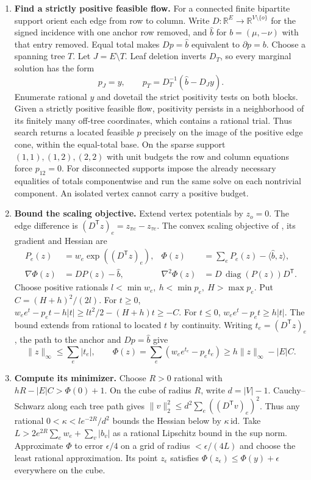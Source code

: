 \documentclass[11pt,a4paper]{article}
\theoremstyle{definition}
\theoremstyle{remark}\newaliascnt{remark}{theorem}
\newcommand{\R}{\mathbb R}
\newcommand{\id}{\mathrm{id}}
\numberwithin{equation}{section}
\begin{document}
\begin{enumerate}[titledsteps]
    \item \textbf{Find a strictly positive feasible flow.} For a connected finite bipartite support orient each edge from row to column. Write \(D:\R^E\to\R^{V\setminus\{o\}}\) for the signed incidence with one anchor row removed, and \(\widehat b\) for \(b=(\mu,-\nu)\) with that entry removed. Equal total makes \(Dp=\widehat b\) equivalent to \(\partial p=b\). Choose a spanning tree \(T\). Let \(J=E\setminus T\). Leaf deletion inverts \(D_T\), so every marginal solution has the form
\[
 p_J=y,\qquad p_T=D_T^{-1}(\widehat b-D_J y).
\]
Enumerate rational \(y\) and dovetail the strict positivity tests on both blocks. Given a strictly positive feasible flow, positivity persists in a neighborhood of its finitely many off-tree coordinates, which contains a rational trial. Thus search returns a located feasible \(p\) precisely on the image of the positive edge cone, within the equal-total base. On the sparse support \((1,1),(1,2),(2,2)\) with unit budgets the row and column equations force \(p_{12}=0\). For disconnected supports impose the already necessary equalities of totals componentwise and run the same solve on each nontrivial component. An isolated vertex cannot carry a positive budget.


    \item \textbf{Bound the scaling objective.} Extend vertex potentials by \(z_o=0\). The edge difference is \((D^{\mathsf T}z)_e=z_{\pi e}-z_{\tau e}\). The convex scaling objective of \cite{rothblum-scale}, its gradient and Hessian are
\[
\begin{aligned}
 P_e(z)&=w_e\exp((D^{\mathsf T}z)_e),&
 \Phi(z)&=\sum_e P_e(z)-\langle\widehat b,z\rangle,\\
 \nabla\Phi(z)&=DP(z)-\widehat b,&
 \nabla^2\Phi(z)&=D\,\operatorname{diag}(P(z))D^{\mathsf T}.
\end{aligned}
\]
Choose positive rationals \(l<\min w_e,\ h<\min p_e,\ H>\max p_e\). Put \(C=(H+h)^2/(2l)\). For \(t\ge0\), \(w_e e^t-p_et-h|t|\ge lt^2/2-(H+h)t\ge-C\). For \(t\le0\), \(w_e e^t-p_et\ge h|t|\). The bound extends from rational to located \(t\) by continuity. Writing \(t_e=(D^{\mathsf T}z)_e\), the path to the anchor and \(Dp=\widehat b\) give
\[
 \|z\|_\infty\le\sum_e|t_e|,\qquad
 \Phi(z)=\sum_e(w_e e^{t_e}-p_et_e)\ge h\|z\|_\infty-|E|C .
\]

    \item \textbf{Compute its minimizer.} Choose \(R>0\) rational with \(hR-|E|C>\Phi(0)+1\). On the cube of radius \(R\), write \(d=|V|-1\). Cauchy--Schwarz along each tree path gives
\(\|v\|_2^2\le d^2\sum_e((D^{\mathsf T}v)_e)^2\). Thus any rational \(0<\kappa<le^{-2R}/d^2\) bounds the Hessian below by \(\kappa\,\id\). Take \(L>2e^{2R}\sum_e w_e+\sum_v|b_v|\) as a rational Lipschitz bound in the sup norm. Approximate \(\Phi\) to error \(\epsilon/4\) on a grid of radius \(<\epsilon/(4L)\) and choose the least rational approximation. Its point \(z_\epsilon\) satisfies \(\Phi(z_\epsilon)\le\Phi(y)+\epsilon\) everywhere on the cube.


\end{enumerate}
\end{document}
